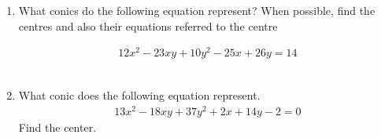 \renewcommand{\theequation}{\theenumi}
\renewcommand{\thefigure}{\theenumi}
\begin{enumerate}[label=\thesection.\arabic*.,ref=\thesection.\theenumi]
%
\item What conics do the following equation represent? When possible, find the centres and also their equations referred to the centre

\begin{align}
12x^2-23xy+10y^2-25x+26y=14\label{eq:solutions/40/1/ques}
\end{align}
\\
\solution

\item What conic does the following equation represent. 
\begin{align}
13x^2-18xy+37y^2+2x+14y-2 = 0
\end{align}
Find the center.
\\
\solution

\end{enumerate}


